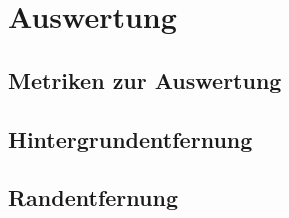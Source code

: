 \chapter{Auswertung}

\section{Metriken zur Auswertung}

\section{Hintergrundentfernung}

\section{Randentfernung}

